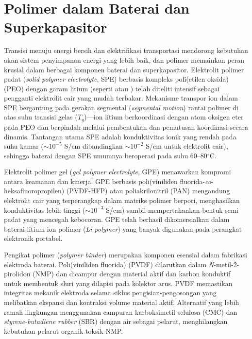\documentclass[12pt,a4paper,openany]{book}
\begin{document}
\section{Polimer dalam Baterai dan Superkapasitor}

Transisi menuju energi bersih dan elektrifikasi transportasi mendorong kebutuhan akan sistem penyimpanan energi yang lebih baik, dan polimer memainkan peran krusial dalam berbagai komponen baterai dan superkapasitor. Elektrolit polimer padat (\textit{solid polymer electrolyte}, SPE) berbasis kompleks poli(etilen oksida) (PEO) dengan garam litium (seperti  atau ) telah diteliti intensif sebagai pengganti elektrolit cair yang mudah terbakar. Mekanisme transpor ion dalam SPE bergantung pada gerakan segmental (\textit{segmental motion}) rantai polimer di atas suhu transisi gelas ($T_g$)---ion litium berkoordinasi dengan atom oksigen eter pada PEO dan berpindah melalui pembentukan dan pemutusan koordinasi secara dinamis. Tantangan utama SPE adalah konduktivitas ionik yang rendah pada suhu kamar ($\sim 10^{-5}$ S/cm dibandingkan $\sim 10^{-2}$ S/cm untuk elektrolit cair), sehingga baterai dengan SPE umumnya beroperasi pada suhu 60--80$^{\circ}$C.

Elektrolit polimer gel (\textit{gel polymer electrolyte}, GPE) menawarkan kompromi antara keamanan dan kinerja. GPE berbasis poli(viniliden fluorida-\textit{co}-heksafluoropropilen) (PVDF-HFP) atau poliakrilonitril (PAN) mengandung elektrolit cair yang terperangkap dalam matriks polimer berpori, menghasilkan konduktivitas lebih tinggi ($\sim 10^{-3}$ S/cm) sambil mempertahankan bentuk semi-padat yang mencegah kebocoran. GPE telah berhasil dikomersialkan dalam baterai litium-ion polimer (\textit{Li-polymer}) yang banyak digunakan pada perangkat elektronik portabel.

Pengikat polimer (\textit{polymer binder}) merupakan komponen esensial dalam fabrikasi elektroda baterai. Poli(viniliden fluorida) (PVDF) dilarutkan dalam \textit{N}-metil-2-pirolidon (NMP) dan dicampur dengan material aktif dan karbon konduktif untuk membentuk sluri yang dilapisi pada kolektor arus. PVDF memastikan integritas mekanik elektroda selama siklus pengisian-pengosongan yang melibatkan ekspansi dan kontraksi volume material aktif. Alternatif yang lebih ramah lingkungan menggunakan campuran karboksimetil selulosa (CMC) dan \textit{styrene-butadiene rubber} (SBR) dengan air sebagai pelarut, menghilangkan kebutuhan pelarut organik toksik NMP.
\end{document}
